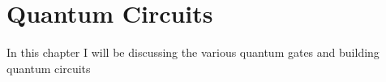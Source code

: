 \documentclass{report}
\begin{document}


\chapter{Quantum Circuits}
In this chapter I will be discussing the various quantum gates and building quantum circuits
\end{document}

